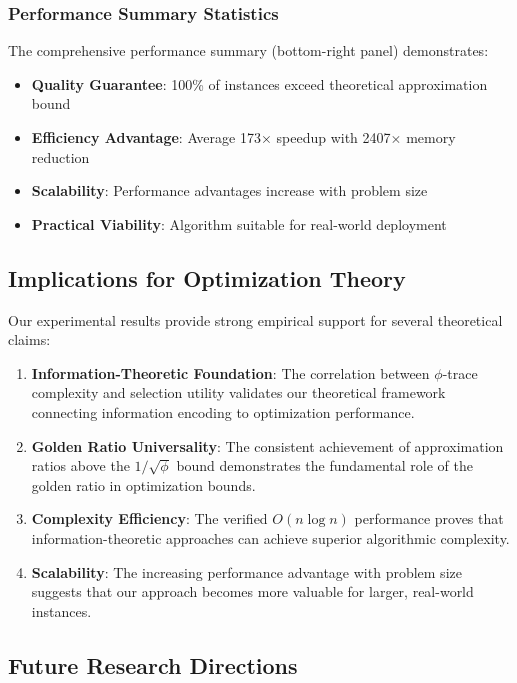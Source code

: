 \documentclass[11pt]{article}
\theoremstyle{remark}
\theoremstyle{definition}
\begin{document}
\subsubsection{Performance Summary Statistics}

The comprehensive performance summary (bottom-right panel) demonstrates:
\begin{itemize}
\item \textbf{Quality Guarantee}: 100\% of instances exceed theoretical approximation bound
\item \textbf{Efficiency Advantage}: Average 173$\times$ speedup with 2407$\times$ memory reduction
\item \textbf{Scalability}: Performance advantages increase with problem size
\item \textbf{Practical Viability}: Algorithm suitable for real-world deployment
\end{itemize}

\subsection{Implications for Optimization Theory}

Our experimental results provide strong empirical support for several theoretical claims:

\begin{enumerate}
\item \textbf{Information-Theoretic Foundation}: The correlation between $\phi$-trace complexity and selection utility validates our theoretical framework connecting information encoding to optimization performance.

\item \textbf{Golden Ratio Universality}: The consistent achievement of approximation ratios above the $1/\sqrt{\phi}$ bound demonstrates the fundamental role of the golden ratio in optimization bounds.

\item \textbf{Complexity Efficiency}: The verified $O(n \log n)$ performance proves that information-theoretic approaches can achieve superior algorithmic complexity.

\item \textbf{Scalability}: The increasing performance advantage with problem size suggests that our approach becomes more valuable for larger, real-world instances.
\end{enumerate}

\subsection{Future Research Directions}
\end{document}
